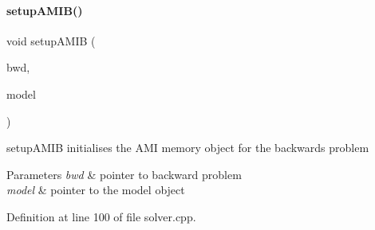 \paragraph{\texorpdfstring{setup\+A\+M\+I\+B()}{setupAMIB()}}
{\footnotesize\ttfamily void setup\+A\+M\+IB (\begin{DoxyParamCaption}\item[{\mbox{\hyperlink{classamici_1_1_backward_problem}{Backward\+Problem}} $\ast$}]{bwd,  }\item[{\mbox{\hyperlink{classamici_1_1_model}{Model}} $\ast$}]{model }\end{DoxyParamCaption})}

setup\+A\+M\+IB initialises the A\+MI memory object for the backwards problem 
\begin{DoxyParams}{Parameters}
{\em bwd} & pointer to backward problem \\
\hline
{\em model} & pointer to the model object \\
\hline
\end{DoxyParams}


Definition at line 100 of file solver.\+cpp.

